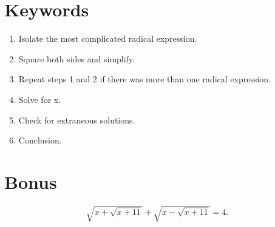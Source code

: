 \begin{CJK}{UTF8}{gkai}
\section{Keywords}
\begin{enumerate}
\item Isolate the most complicated radical expression.
\item Square both sides and simplify.
\item Repeat steps 1 and 2 if there was more than one radical expression.
\item Solve for x.
\item Check for extraneous solutions.
\item Conclusion.
\end{enumerate}

\section{Bonus}
$$\sqrt{x+\sqrt{x+11}}+\sqrt{x-\sqrt{x+11}}=4.$$

\end{CJK}
